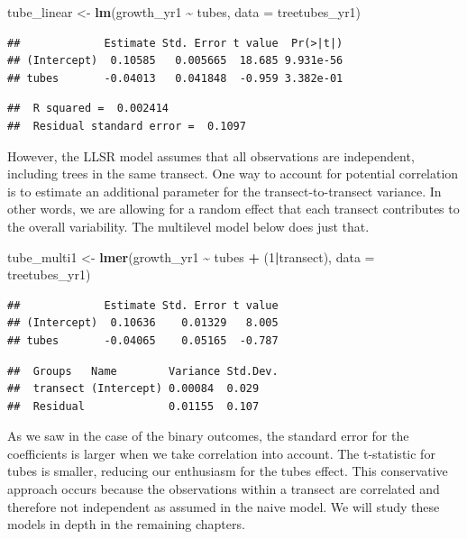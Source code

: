 \documentclass[
]{krantz}
\newenvironment{Shaded}{\begin{snugshade}}{\end{snugshade}}
\newcommand{\AttributeTok}[1]{\textcolor[rgb]{0.27,0.27,0.27}{#1}}
\newcommand{\DecValTok}[1]{\textcolor[rgb]{0.06,0.06,0.06}{#1}}
\newcommand{\FunctionTok}[1]{\textcolor[rgb]{0.27,0.27,0.27}{\textbf{#1}}}
\newcommand{\NormalTok}[1]{#1}
\newcommand{\OtherTok}[1]{\textcolor[rgb]{0.37,0.37,0.37}{#1}}
\newcommand{\SpecialCharTok}[1]{\textcolor[rgb]{0.43,0.43,0.43}{\textbf{#1}}}
\begin{document}
\begin{Shaded}
\begin{Highlighting}[]
\NormalTok{tube\_linear }\OtherTok{\textless{}{-}} \FunctionTok{lm}\NormalTok{(growth\_yr1 }\SpecialCharTok{\textasciitilde{}}\NormalTok{ tubes, }\AttributeTok{data =}\NormalTok{ treetubes\_yr1)}
\end{Highlighting}
\end{Shaded}

\begin{verbatim}
##             Estimate Std. Error t value  Pr(>|t|)
## (Intercept)  0.10585   0.005665  18.685 9.931e-56
## tubes       -0.04013   0.041848  -0.959 3.382e-01
\end{verbatim}

\begin{verbatim}
##  R squared =  0.002414 
##  Residual standard error =  0.1097
\end{verbatim}

However, the LLSR model assumes that all observations are independent, including trees in the same transect. One way to account for potential correlation is to estimate an additional parameter for the transect-to-transect variance. In other words, we are allowing for a random effect that each transect contributes to the overall variability. The multilevel model below does just that.

\begin{Shaded}
\begin{Highlighting}[]
\NormalTok{tube\_multi1 }\OtherTok{\textless{}{-}} \FunctionTok{lmer}\NormalTok{(growth\_yr1 }\SpecialCharTok{\textasciitilde{}}\NormalTok{ tubes }\SpecialCharTok{+}\NormalTok{ (}\DecValTok{1}\SpecialCharTok{|}\NormalTok{transect), }
                    \AttributeTok{data =}\NormalTok{ treetubes\_yr1)}
\end{Highlighting}
\end{Shaded}

\begin{verbatim}
##             Estimate Std. Error t value
## (Intercept)  0.10636    0.01329   8.005
## tubes       -0.04065    0.05165  -0.787
\end{verbatim}

\begin{verbatim}
##  Groups   Name        Variance Std.Dev.
##  transect (Intercept) 0.00084  0.029   
##  Residual             0.01155  0.107
\end{verbatim}

As we saw in the case of the binary outcomes, the standard error for the coefficients is larger when we take correlation into account. The t-statistic for tubes is smaller, reducing our enthusiasm for the tubes effect. This conservative approach occurs because the observations within a transect are correlated and therefore not independent as assumed in the naive model. We will study these models in depth in the remaining chapters.
\end{document}
